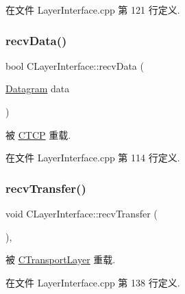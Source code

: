 在文件 Layer\+Interface.\+cpp 第 121 行定义.

\mbox{\label{class_c_layer_interface_a72415f0966b67359e0ee885d98827c3f}} 
\subsubsection{\texorpdfstring{recv\+Data()}{recvData()}}
{\footnotesize\ttfamily bool C\+Layer\+Interface\+::recv\+Data (\begin{DoxyParamCaption}\item[{\hyperlink{class_datagram}{Datagram}}]{data }\end{DoxyParamCaption})\hspace{0.3cm}{\ttfamily [virtual]}}



被 \hyperlink{class_c_t_c_p_aed8fdd632e22efee66dbbb95e951b5c2}{C\+T\+CP} 重载.



在文件 Layer\+Interface.\+cpp 第 114 行定义.

\mbox{\label{class_c_layer_interface_aca72cd6ae77b4e4b4c1d058377583110}} 
\subsubsection{\texorpdfstring{recv\+Transfer()}{recvTransfer()}}
{\footnotesize\ttfamily void C\+Layer\+Interface\+::recv\+Transfer (\begin{DoxyParamCaption}{ }\end{DoxyParamCaption})\hspace{0.3cm}{\ttfamily [protected]}, {\ttfamily [virtual]}}



被 \hyperlink{class_c_transport_layer_ad30133ccd6047d127d5a9feec593877d}{C\+Transport\+Layer} 重载.



在文件 Layer\+Interface.\+cpp 第 138 行定义.

\mbox{\label{class_c_layer_interface_ac98e8ced890a29b4b76e16cfa3defddb}} 
